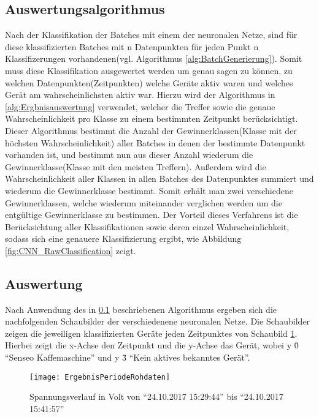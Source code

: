     \subsection{Auswertungsalgorithmus}\label{Auswertungsalgorithmus}
    Nach der Klassifikation der Batches mit einem der neuronalen Netze, sind für diese klassifizierten Batches mit n Datenpunkten für jeden Punkt n Klassifizerungen vorhandenen(vgl. Algorithmus \ref{alg:BatchGenerierung}).
    Somit muss diese Klassifikation ausgewertet werden um genau sagen zu können, zu welchen Datenpunkten(Zeitpunkten) welche Geräte aktiv waren und welches Gerät am wahrscheinlichsten aktiv war.
    Hierzu wird der Algorithmus in \ref{alg:Ergbnisauswertung} verwendet, welcher die Treffer sowie die genaue Wahrscheinlichkeit pro Klasse zu einem bestimmten Zeitpunkt berücksichtigt. 
    Dieser Algorithmus bestimmt die Anzahl der Gewinnerklassen(Klasse mit der höchsten Wahrscheinlichkeit) aller Batches in denen der bestimmte Datenpunkt vorhanden ist, und bestimmt nun aus dieser Anzahl wiederum die Gewinnerklasse(Klasse mit den meisten Treffern).
    Außerdem wird die Wahrscheinlichkeit aller Klassen in allen Batches des Datenpunktes summiert und wiederum die Gewinnerklasse bestimmt.
    Somit erhält man zwei verschiedene Gewinnerklassen, welche wiederum miteinander verglichen werden um die entgültige Gewinnerklasse zu bestimmen.
    \newline
    \noindent
    Der Vorteil dieses Verfahrens ist die Berücksichtung aller Klassifikationen sowie deren einzel Wahrscheinlichkeit, sodass sich eine genauere Klassifizierung ergibt, wie Abbildung \ref{fig:CNN_RawClassification} zeigt.
    \subsection{Auswertung}
    Nach Anwendung des in \ref{Auswertungsalgorithmus} beschriebenen Algorithmus ergeben sich die nachfolgenden Schaubilder der verschiedenene neuronalen Netze.
    Die Schaubilder zeigen die jeweiligen klassifizierten Geräte jeden Zeitpunktes von Schaubild \ref{fig:ResultClassificationPeriod}.
    Hierbei zeigt die x-Achse den Zeitpunkt und die y-Achse das Gerät, wobei y \= 0  "`Senseo Kaffemaschine"' und y \= 3 "`Kein aktives bekanntes Gerät"'.
    
    \begin{figure}[H]
        \centering
        \texttt{[image: ErgebnisPeriodeRohdaten]}
        \caption{Spannungsverlauf in Volt von "`24.10.2017 15:29:44"' bis "`24.10.2017 15:41:57"'}
        \label{fig:ResultClassificationPeriod}
    \end{figure}

